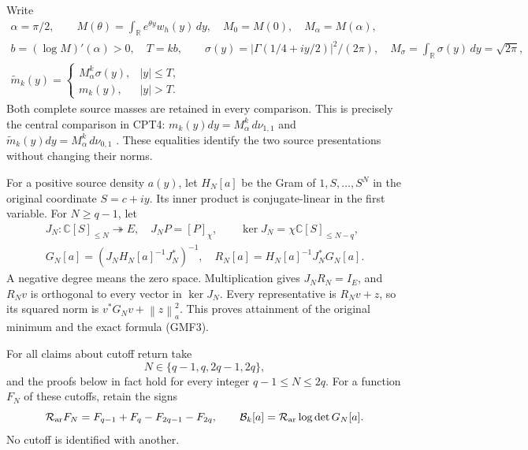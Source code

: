 \documentclass[11pt]{article}
\newcommand{\C}{\mathbb C}
\newcommand{\R}{\mathbb R}
\newcommand{\Bcal}{\mathcal B}
\newcommand{\norm}[1]{\left\lVert#1\right\rVert}
\begin{document}
Write
\begin{equation}\tag{GMF2}
\begin{gathered}
 \alpha=\pi/2,\qquad
 M(\theta)=\int_\R e^{\theta y}w_h(y)\,dy,\quad
 M_0=M(0),\quad M_\alpha=M(\alpha),\\
 b=(\log M)'(\alpha)>0,\quad T=kb,\qquad
 \sigma(y)=|\Gamma(1/4+iy/2)|^2/(2\pi),\quad
 M_\sigma=\int_\R\sigma(y)\,dy=\sqrt{2\pi},\\
 \widetilde m_k(y)=
 \begin{cases}M_\alpha^k\sigma(y),&|y|\le T,\\
 m_k(y),&|y|>T.\end{cases}
\end{gathered}
\end{equation}
Both complete source masses are retained in every comparison.
This is precisely the central comparison in CPT4:
\(m_k(y)dy=M_\alpha^k\,d\nu_{1,1}\) and
\(\widetilde m_k(y)dy=M_\alpha^k\,d\nu_{0,1}\)
\cite{cpt}.  These equalities identify the two source
presentations without changing their norms.

For a positive source density \(a(y)\), let \(H_N[a]\) be the
Gram of \(1,S,\ldots,S^N\) in the original coordinate \(S=c+iy\).
Its inner product is conjugate-linear in the first variable.
For \(N\ge q-1\), let
\begin{equation}\tag{GMF3}
\begin{gathered}
 J_N:\C[S]_{\le N}\twoheadrightarrow E,\quad
                  J_NP=[P]_\chi,\qquad
 \ker J_N=\chi\C[S]_{\le N-q},\\
 G_N[a]=(J_NH_N[a]^{-1}J_N^*)^{-1},\quad
 R_N[a]=H_N[a]^{-1}J_N^*G_N[a].
\end{gathered}
\end{equation}
A negative degree means the zero space.  Multiplication gives
\(J_NR_N=I_E\), and \(R_Nv\) is orthogonal to every vector in
\(\ker J_N\).  Every representative is \(R_Nv+z\), so its squared
norm is \(v^*G_Nv+\norm z_a^2\).
This proves attainment of the original minimum and the exact
formula (GMF3).

For all claims about cutoff return take
\[
 N\in\{q-1,q,2q-1,2q\},
\]
and the proofs below in fact hold for every integer
\(q-1\le N\le2q\).
For a function \(F_N\) of these cutoffs, retain the signs
\[
 \mathcal R_{\rm ar}F_N=F_{q-1}+F_q-F_{2q-1}-F_{2q},\qquad
 \Bcal_k[a]=\mathcal R_{\rm ar}\log\det G_N[a].
\]
No cutoff is identified with another.
\end{document}
